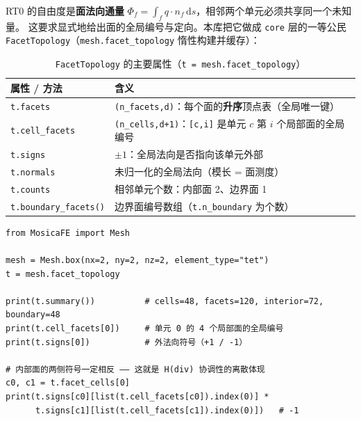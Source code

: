 \documentclass[UTF8,11pt,oneside]{ctexbook}
\theoremstyle{definition}
\theoremstyle{plain}
\newcommand{\code}[1]{\texttt{#1}}
\newcommand{\dif}{\,\mathrm{d}}
\begin{document}
RT0 的自由度是\textbf{面法向通量}
$\Phi_f=\int_f q\cdot n_f\dif s$，相邻两个单元必须共享同一个未知量。
这要求显式地给出面的全局编号与定向。本库把它做成 \code{core} 层的一等公民
\code{FacetTopology}（\code{mesh.facet\_\allowbreak topology} 惰性构建并缓存）：

\begin{table}[htbp]
\centering
\caption{\code{FacetTopology} 的主要属性（\code{t = mesh.facet\_topology}）}
\label{tab:facettopo}
\begin{lrbox}{\guideTableBox}
\begin{tabular}{@{}L{4.4cm}L{10.0cm}@{}}
\toprule
属性 / 方法 & 含义 \\
\midrule
\code{t.facets} & \code{(n\_\allowbreak facets,\allowbreak  d)}：每个面的\textbf{升序}顶点表（全局唯一键） \\
\code{t.cell\_\allowbreak facets} & \code{(n\_\allowbreak cells,\allowbreak  d+1)}：\code{[c,\allowbreak i]} 是单元 $c$ 第 $i$ 个局部面的全局编号 \\
\code{t.signs} & $\pm1$：全局法向是否指向该单元外部 \\
\code{t.normals} & 未归一化的全局法向（模长 = 面测度） \\
\code{t.counts} & 相邻单元个数：内部面 2、边界面 1 \\
\code{t.boundary\_\allowbreak facets()} & 边界面编号数组（\code{t.n\_\allowbreak boundary} 为个数） \\
\bottomrule
\end{tabular}
\end{lrbox}%
\ifdim\wd\guideTableBox>\linewidth
  \resizebox{\linewidth}{!}{\usebox{\guideTableBox}}%
\else\usebox{\guideTableBox}\fi
\end{table}

\begin{lstlisting}[language=MosicaFE,caption={示例 4.2：面拓扑与定向}]
from MosicaFE import Mesh

mesh = Mesh.box(nx=2, ny=2, nz=2, element_type="tet")
t = mesh.facet_topology

print(t.summary())          # cells=48, facets=120, interior=72, boundary=48
print(t.cell_facets[0])     # 单元 0 的 4 个局部面的全局编号
print(t.signs[0])           # 外法向符号（+1 / -1）

# 内部面的两侧符号一定相反 —— 这就是 H(div) 协调性的离散体现
c0, c1 = t.facet_cells[0]
print(t.signs[c0][list(t.cell_facets[c0]).index(0)] *
      t.signs[c1][list(t.cell_facets[c1]).index(0)])   # -1
\end{lstlisting}
\end{document}
